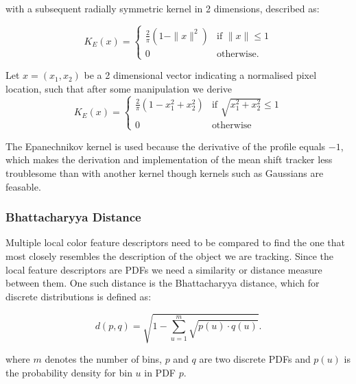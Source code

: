 \documentclass[a4paper,11pt]{article}
\begin{document}
with a subsequent radially symmetric kernel in 2 dimensions, described as:

\begin{equation}
\label{eq:epanechnikov_kernel1}
K_E(x) = \left\{ \begin{array}{cl}
  \frac{2}{\pi} (1-\|x\|^2) & \textrm{if } \|x\| \leq 1 \\
  0 & \textrm{otherwise.} \end{array}\right.
\end{equation}

Let $x = (x_1,x_2)$ be a 2 dimensional vector indicating a normalised pixel location, such that after some manipulation we derive
\begin{equation}
\label{eq:epanechnikov_kernel2}
K_E(x) = \left\{ \begin{array}{cl}
  \frac{2}{\pi} (1-x_1^2 + x_2^2) & \textrm{if } \sqrt{x_1^2 + x_2^2} \leq 1 \\
  0 & \textrm{otherwise} \end{array}\right.
\end{equation}




The Epanechnikov kernel is used because the derivative of the profile equals $-1$, which makes the derivation and implementation of the mean shift tracker less troublesome than with another kernel though kernels such as Gaussians are feasable.



\subsubsection{Bhattacharyya Distance}

Multiple local color feature descriptors need to be compared to find the one that most closely resembles the description of the object we are tracking. Since the local feature descriptors are PDFs we need a similarity or distance measure between them. One such distance is the Bhattacharyya distance, which for discrete distributions is defined as:



\begin{equation}
\label{eq:bhattdistance}
d(p,q) = \sqrt{1-\sum_{u=1}^{m} \sqrt{p(u)\cdot q(u)}}.
\end{equation}

where $m$ denotes the number of bins, $p$ and $q$ are two discrete PDFs and $p(u)$ is the probability density for bin $u$ in PDF $p$. 
\end{document}
